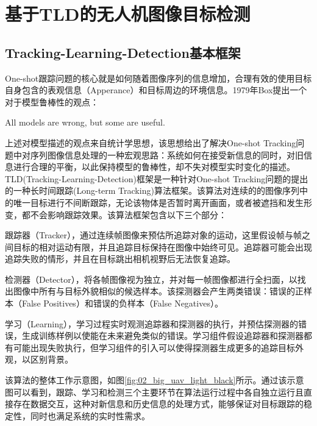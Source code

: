 

\section{基于TLD的无人机图像目标检测}
\subsection{Tracking-Learning-Detection基本框架}
One-shot跟踪问题的核心就是如何随着图像序列的信息增加，合理有效的使用目标自身包含的表观信息（Apperance）和目标周边的环境信息。1979年Box提出一个对于模型鲁棒性的观点\cite{box1979robustness}：

\begin{center}
All models are wrong, but some are useful.
\end{center} 



上述对模型描述的观点来自统计学思想，该思想给出了解决One-shot Tracking问题中对序列图像信息处理的一种宏观思路：系统如何在接受新信息的同时，对旧信息进行合理的平衡，以此保持模型的鲁棒性，却不失对模型实时变化的描述。TLD(Tracking-Learning-Detection)\cite{kalal2012tracking}框架是一种针对One-shot Tracking问题的提出的一种长时间跟踪(Long-term Tracking)算法框架。该算法对连续的的图像序列中的唯一目标进行不间断跟踪，无论该物体是否暂时离开画面，或者被遮挡和发生形变，都不会影响跟踪效果。该算法框架包含以下三个部分：
\begin{compactenum}
	\item 跟踪器（Tracker），通过连续帧图像来预估所追踪对象的运动，这里假设帧与帧之间目标的相对运动有限，并且追踪目标保持在图像中始终可见。追踪器可能会出现追踪失败的情形，并且在目标跳出相机视野后无法恢复追踪。
	\item 检测器（Detector），将各帧图像视为独立，并对每一帧图像都进行全扫面，以找出图像中所有与目标外貌相似的候选样本。该探测器会产生两类错误：错误的正样本（False Positives）和错误的负样本（False Negatives）。
	\item 学习（Learning），学习过程实时观测追踪器和探测器的执行，并预估探测器的错误，生成训练样例以使能在未来避免类似的错误。学习组件假设追踪器和探测器都有可能出现失败执行，但学习组件的引入可以使得探测器生成更多的追踪目标外观，以区别背景。
\end{compactenum}

该算法的整体工作示意图，如图\ref{fig:02_big_uav_light_black}所示\cite{kalal2012tracking}。通过该示意图可以看到，跟踪、学习和检测三个主要环节在算法运行过程中各自独立运行且直接存在数据交互，这种对新信息和历史信息的处理方式，能够保证对目标跟踪的稳定性，同时也满足系统的实时性需求。

